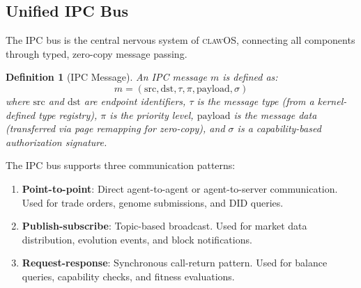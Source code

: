\documentclass{article}
\newtheorem{definition}{Definition}
\newcommand{\clawos}{\textsc{clawOS}}
\begin{document}
\subsection{Unified IPC Bus}
\label{subsec:ipc}

The IPC bus is the central nervous system of \clawos{}, connecting all components through typed, zero-copy message passing.

\begin{definition}[IPC Message]
An IPC message $m$ is defined as:
$$m = (\text{src}, \text{dst}, \tau, \pi, \text{payload}, \sigma)$$
where $\text{src}$ and $\text{dst}$ are endpoint identifiers, $\tau$ is the message type (from a kernel-defined type registry), $\pi$ is the priority level, $\text{payload}$ is the message data (transferred via page remapping for zero-copy), and $\sigma$ is a capability-based authorization signature.
\end{definition}

The IPC bus supports three communication patterns:

\begin{enumerate}[leftmargin=*]
    \item \textbf{Point-to-point}: Direct agent-to-agent or agent-to-server communication. Used for trade orders, genome submissions, and DID queries.
    \item \textbf{Publish-subscribe}: Topic-based broadcast. Used for market data distribution, evolution events, and block notifications.
    \item \textbf{Request-response}: Synchronous call-return pattern. Used for balance queries, capability checks, and fitness evaluations.
\end{enumerate}
\end{document}
